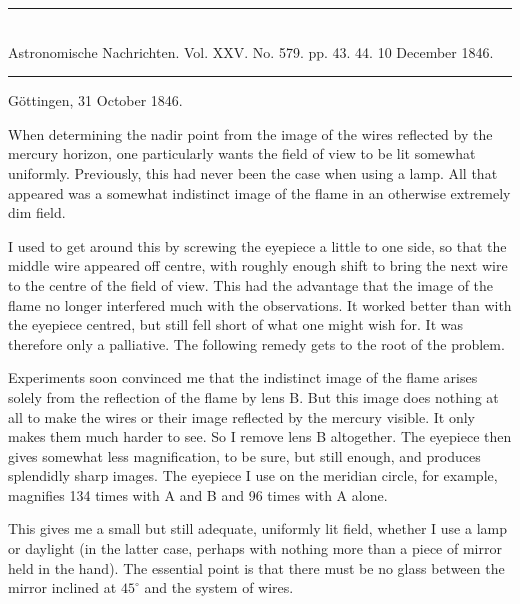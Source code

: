 \clearpage
{}
\begin{center}
\rule{0.55\linewidth}{0.4pt}\\[2pt]
Astronomische Nachrichten. Vol. XXV. No. 579. pp. 43. 44. 10 December 1846.\\[2pt]
\rule{0.55\linewidth}{0.4pt}
\end{center}
\begin{flushright}Göttingen, 31 October 1846.\end{flushright}

When determining the nadir point from the image of the wires reflected by the mercury horizon, one particularly wants the field of view to be lit somewhat uniformly. Previously, this had never been the case when using a lamp. All that appeared was a somewhat indistinct image of the flame in an otherwise extremely dim field.

I used to get around this by screwing the eyepiece a little to one side, so that the middle wire appeared off centre, with roughly enough shift to bring the next wire to the centre of the field of view. This had the advantage that the image of the flame no longer interfered much with the observations. It worked better than with the eyepiece centred, but still fell short of what one might wish for. It was therefore only a palliative. The following remedy gets to the root of the problem.

\begin{center}

\end{center}

Experiments soon convinced me that the indistinct image of the flame arises solely from the reflection of the flame by lens B. But this image does nothing at all to make the wires or their image reflected by the mercury visible. It only makes them much harder to see. So I remove lens B altogether. The eyepiece then gives somewhat less magnification, to be sure, but still enough, and produces splendidly sharp images. The eyepiece I use on the meridian circle, for example, magnifies 134 times with A and B and 96 times with A alone.

This gives me a small but still adequate, uniformly lit field, whether I use a lamp or daylight (in the latter case, perhaps with nothing more than a piece of mirror held in the hand). The essential point is that there must be no glass between the mirror inclined at $45^\circ$ and the system of wires.
